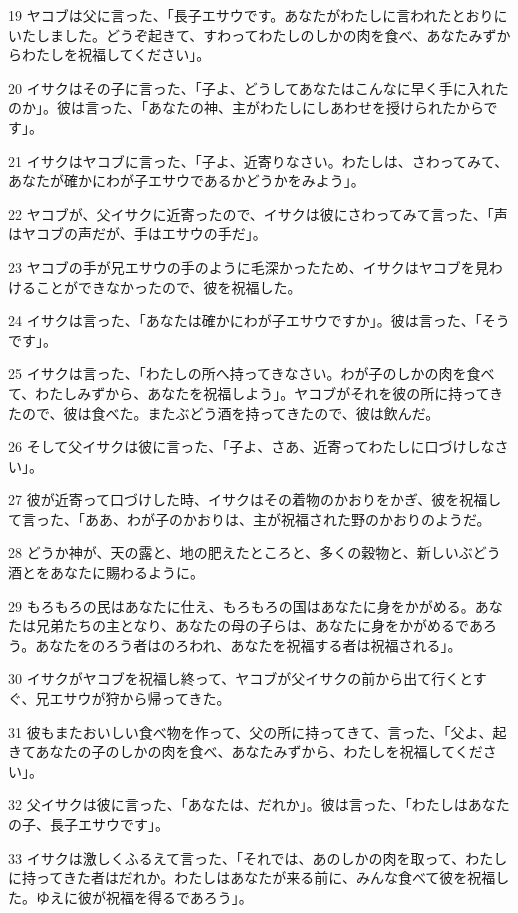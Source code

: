 \par 19 ヤコブは父に言った、「長子エサウです。あなたがわたしに言われたとおりにいたしました。どうぞ起きて、すわってわたしのしかの肉を食べ、あなたみずからわたしを祝福してください」。
\par 20 イサクはその子に言った、「子よ、どうしてあなたはこんなに早く手に入れたのか」。彼は言った、「あなたの神、主がわたしにしあわせを授けられたからです」。
\par 21 イサクはヤコブに言った、「子よ、近寄りなさい。わたしは、さわってみて、あなたが確かにわが子エサウであるかどうかをみよう」。
\par 22 ヤコブが、父イサクに近寄ったので、イサクは彼にさわってみて言った、「声はヤコブの声だが、手はエサウの手だ」。
\par 23 ヤコブの手が兄エサウの手のように毛深かったため、イサクはヤコブを見わけることができなかったので、彼を祝福した。
\par 24 イサクは言った、「あなたは確かにわが子エサウですか」。彼は言った、「そうです」。
\par 25 イサクは言った、「わたしの所へ持ってきなさい。わが子のしかの肉を食べて、わたしみずから、あなたを祝福しよう」。ヤコブがそれを彼の所に持ってきたので、彼は食べた。またぶどう酒を持ってきたので、彼は飲んだ。
\par 26 そして父イサクは彼に言った、「子よ、さあ、近寄ってわたしに口づけしなさい」。
\par 27 彼が近寄って口づけした時、イサクはその着物のかおりをかぎ、彼を祝福して言った、「ああ、わが子のかおりは、主が祝福された野のかおりのようだ。
\par 28 どうか神が、天の露と、地の肥えたところと、多くの穀物と、新しいぶどう酒とをあなたに賜わるように。
\par 29 もろもろの民はあなたに仕え、もろもろの国はあなたに身をかがめる。あなたは兄弟たちの主となり、あなたの母の子らは、あなたに身をかがめるであろう。あなたをのろう者はのろわれ、あなたを祝福する者は祝福される」。
\par 30 イサクがヤコブを祝福し終って、ヤコブが父イサクの前から出て行くとすぐ、兄エサウが狩から帰ってきた。
\par 31 彼もまたおいしい食べ物を作って、父の所に持ってきて、言った、「父よ、起きてあなたの子のしかの肉を食べ、あなたみずから、わたしを祝福してください」。
\par 32 父イサクは彼に言った、「あなたは、だれか」。彼は言った、「わたしはあなたの子、長子エサウです」。
\par 33 イサクは激しくふるえて言った、「それでは、あのしかの肉を取って、わたしに持ってきた者はだれか。わたしはあなたが来る前に、みんな食べて彼を祝福した。ゆえに彼が祝福を得るであろう」。
